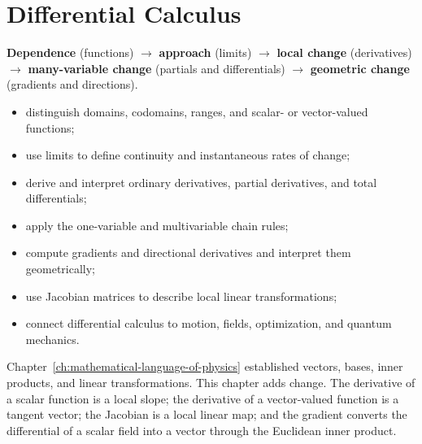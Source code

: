 \chapter{Differential Calculus}
\label{ch:differential-calculus}

\begin{roadmapbox}
\textbf{Dependence} (functions) $\longrightarrow$ \textbf{approach} (limits) $\longrightarrow$ \textbf{local change} (derivatives) $\longrightarrow$ \textbf{many-variable change} (partials and differentials) $\longrightarrow$ \textbf{geometric change} (gradients and directions).
\end{roadmapbox}

\learningobjectives
\begin{itemize}
\item distinguish domains, codomains, ranges, and scalar- or vector-valued functions;
\item use limits to define continuity and instantaneous rates of change;
\item derive and interpret ordinary derivatives, partial derivatives, and total differentials;
\item apply the one-variable and multivariable chain rules;
\item compute gradients and directional derivatives and interpret them geometrically;
\item use Jacobian matrices to describe local linear transformations;
\item connect differential calculus to motion, fields, optimization, and quantum mechanics.
\end{itemize}

\begin{bookinsight}
Chapter~\ref{ch:mathematical-language-of-physics} established vectors, bases, inner products, and linear transformations. This chapter adds change. The derivative of a scalar function is a local slope; the derivative of a vector-valued function is a tangent vector; the Jacobian is a local linear map; and the gradient converts the differential of a scalar field into a vector through the Euclidean inner product.
\end{bookinsight}

